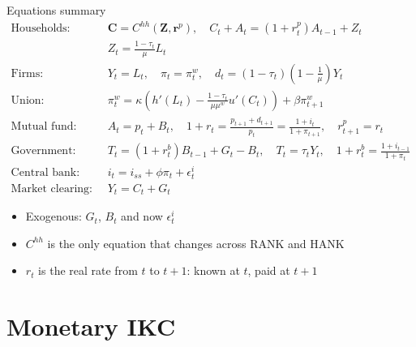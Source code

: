 \documentclass[10pt,english]{beamer}
\begin{document}
\begin{frame}{Equations summary}
\vspace{-3mm}
{\footnotesize
\begin{align*}
\text{Households:}\quad & \boldsymbol{C}=C^{hh}(\boldsymbol{Z},\boldsymbol{r}^{p}),\quad C_{t}+A_{t}=(1+r_{t}^{p})A_{t-1}+Z_{t}\\
 & Z_{t}=\frac{1-\tau_{t}}{\mu}L_{t}\\
\text{Firms:}\quad & Y_{t}=L_{t},\quad\pi_{t}=\pi_{t}^{w},\quad d_{t}=(1-\tau_{t})\left(1-\frac{1}{\mu}\right)Y_{t}\\
\text{Union:}\quad & \pi_{t}^{w}=\kappa\left(h'\left(L_{t}\right)-\frac{1-\tau_{t}}{\mu\mu^{w}}u'\left(C_{t}\right)\right)+\beta\pi_{t+1}^{w}\\
\text{Mutual fund:}\quad & A_{t}=p_{t}+B_{t},\quad1+r_{t}=\frac{p_{t+1}+d_{t+1}}{p_{t}}=\frac{1+i_{t}}{1+\pi_{t+1}},\quad r_{t+1}^{p}=r_{t}\\
\text{Government:}\quad & T_{t}=(1+r_{t}^{b})B_{t-1}+G_{t}-B_{t},\quad T_{t}=\tau_{t}Y_{t},\quad1+r_{t}^{b}=\frac{1+i_{t-1}}{1+\pi_{t}}\\
\text{Central bank:}\quad & i_{t}=i_{ss}+\phi\pi_{t}+\epsilon_{t}^{i}\\
\text{Market clearing:}\quad & Y_{t}=C_{t}+G_{t}
\end{align*}
}
\begin{itemize}
\item <+->Exogenous: $G_{t}$, $B_{t}$ and now $\epsilon_{t}^{i}$
\item <+->$C^{hh}$ is the only equation that changes across RANK and HANK
\item <+->$r_{t}$ is the real rate from $t$ to $t+1$: known at $t$, paid at $t+1$
\end{itemize}
\end{frame}
%

\section{Monetary IKC}
\end{document}
